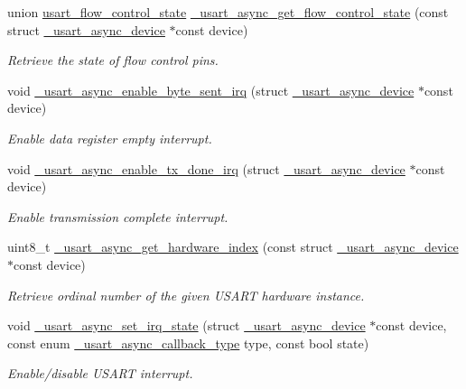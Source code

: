 \begin{DoxyCompactItemize}
union \hyperlink{unionusart__flow__control__state}{usart\+\_\+flow\+\_\+control\+\_\+state} \hyperlink{group___h_p_l_gaa9850f9d97cb87f80fa615e95330ce35}{\+\_\+usart\+\_\+async\+\_\+get\+\_\+flow\+\_\+control\+\_\+state} (const struct \hyperlink{struct__usart__async__device}{\+\_\+usart\+\_\+async\+\_\+device} $\ast$const device)
\begin{DoxyCompactList}\small\item\em Retrieve the state of flow control pins. \end{DoxyCompactList}\item 
void \hyperlink{group___h_p_l_ga5dcb14840b2011da3a1d0f774dafa28d}{\+\_\+usart\+\_\+async\+\_\+enable\+\_\+byte\+\_\+sent\+\_\+irq} (struct \hyperlink{struct__usart__async__device}{\+\_\+usart\+\_\+async\+\_\+device} $\ast$const device)
\begin{DoxyCompactList}\small\item\em Enable data register empty interrupt. \end{DoxyCompactList}\item 
void \hyperlink{group___h_p_l_ga89bf3d02a7a3cca261900906ffd9ca76}{\+\_\+usart\+\_\+async\+\_\+enable\+\_\+tx\+\_\+done\+\_\+irq} (struct \hyperlink{struct__usart__async__device}{\+\_\+usart\+\_\+async\+\_\+device} $\ast$const device)
\begin{DoxyCompactList}\small\item\em Enable transmission complete interrupt. \end{DoxyCompactList}\item 
uint8\+\_\+t \hyperlink{group___h_p_l_ga378f2b4e0a90e5f5e354da00b3e6e531}{\+\_\+usart\+\_\+async\+\_\+get\+\_\+hardware\+\_\+index} (const struct \hyperlink{struct__usart__async__device}{\+\_\+usart\+\_\+async\+\_\+device} $\ast$const device)
\begin{DoxyCompactList}\small\item\em Retrieve ordinal number of the given U\+S\+A\+RT hardware instance. \end{DoxyCompactList}\item 
void \hyperlink{group___h_p_l_gadd7a2a78a76c6286f474bdce333c4904}{\+\_\+usart\+\_\+async\+\_\+set\+\_\+irq\+\_\+state} (struct \hyperlink{struct__usart__async__device}{\+\_\+usart\+\_\+async\+\_\+device} $\ast$const device, const enum \hyperlink{group___h_p_l_gace00dc77ac02c91f8bf35551b484927c}{\+\_\+usart\+\_\+async\+\_\+callback\+\_\+type} type, const bool state)
\begin{DoxyCompactList}\small\item\em Enable/disable U\+S\+A\+RT interrupt. \end{DoxyCompactList}\end{DoxyCompactItemize}
